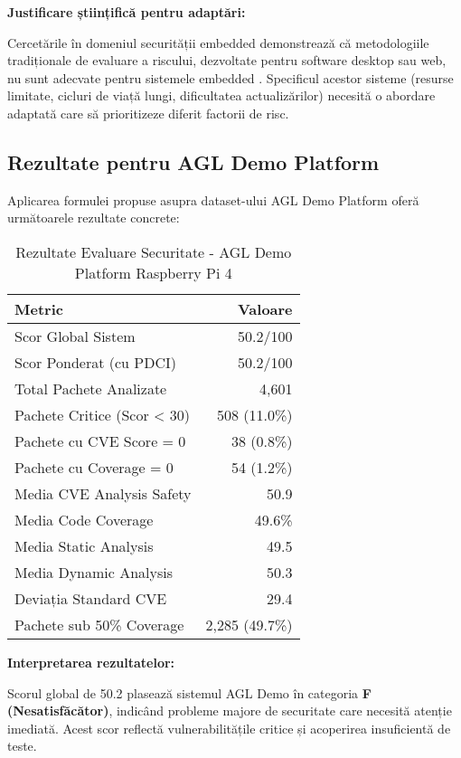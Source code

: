\documentclass[12pt,a4paper]{article}
\begin{document}
\textbf{Justificare științifică pentru adaptări:}

Cercetările în domeniul securității embedded demonstrează că metodologiile tradiționale de evaluare a riscului, dezvoltate pentru software desktop sau web, nu sunt adecvate pentru sistemele embedded \cite{yasasin2020security,neutatz2019automated}. Specificul acestor sisteme (resurse limitate, cicluri de viață lungi, dificultatea actualizărilor) necesită o abordare adaptată care să prioritizeze diferit factorii de risc.

\subsection{Rezultate pentru AGL Demo Platform}

Aplicarea formulei propuse asupra dataset-ului AGL Demo Platform oferă următoarele rezultate concrete:

\begin{table}[H]
\centering
\caption{Rezultate Evaluare Securitate - AGL Demo Platform Raspberry Pi 4}
\begin{tabular}{@{}lr@{}}
\toprule
\textbf{Metric} & \textbf{Valoare} \\
\midrule
Scor Global Sistem & 50.2/100 \\
Scor Ponderat (cu PDCI) & 50.2/100 \\
Total Pachete Analizate & 4,601 \\
Pachete Critice (Scor < 30) & 508 (11.0\%) \\
Pachete cu CVE Score = 0 & 38 (0.8\%) \\
Pachete cu Coverage = 0 & 54 (1.2\%) \\
Media CVE Analysis Safety & 50.9 \\
Media Code Coverage & 49.6\% \\
Media Static Analysis & 49.5 \\
Media Dynamic Analysis & 50.3 \\
Deviația Standard CVE & 29.4 \\
Pachete sub 50\% Coverage & 2,285 (49.7\%) \\
\bottomrule
\end{tabular}
\end{table}

\textbf{Interpretarea rezultatelor:}

Scorul global de 50.2 plasează sistemul AGL Demo în categoria \textbf{F (Nesatisfăcător)}, indicând probleme majore de securitate care necesită atenție imediată. Acest scor reflectă vulnerabilitățile critice și acoperirea insuficientă de teste.
\end{document}
